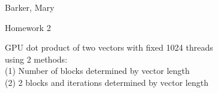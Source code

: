 \documentclass{article}
\def \hwnum{2}
\def \hwdescription{GPU dot product of two vectors with fixed 1024 threads \\ using 2 methods: \\ (1) Number of blocks determined by vector length \\ (2) 2 blocks and iterations determined by vector length}
\def \hwscript{hw02.cu}
\begin{document}
{\color{white}{thing}}
\begin{center}
{
	\fontsize{20pt}{20pt}\selectfont
	Barker, Mary
}

\vspace{1cm}

{
	\fontsize{20pt}{20pt}\selectfont
	Homework \hwnum
}

\vspace{1cm}

{
	\fontsize{20pt}{20pt}\selectfont
	\hwdescription
}

\end{center}
\pagebreak

\end{document}
